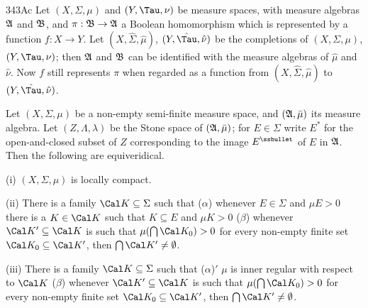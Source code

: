 \spheader 343Ac Let $(X,\Sigma,\mu)$ and $(Y,\Tau,\nu)$ be
measure spaces, with measure algebras $\frak A$ and $\frak B$, and
$\pi:\frak B\to\frak A$ a Boolean homomorphism which is represented by
a function $f:X\to Y$.   Let $(X,\hat\Sigma,\hat\mu)$,
$(Y,\hat\Tau,\hat\nu)$ be the completions of $(X,\Sigma,\mu)$,
$(Y,\Tau,\nu)$;  then $\frak A$ and $\frak B$ can be identified with
the measure algebras of $\hat\mu$ and $\hat\nu$.   Now
$f$ still represents $\pi$ when regarded as a function from
$(X,\hat\Sigma,\hat\mu)$ to $(Y,\hat\Tau,\hat\nu)$.   %

 Let $(X,\Sigma,\mu)$ be a non-empty
semi-finite measure space, and $(\frak A,\bar\mu)$ its measure algebra.
Let $(Z,\Lambda,\lambda)$ be the Stone space of $(\frak A,\bar\mu)$;
for $E\in\Sigma$ write $E^*$ for the
open-and-closed subset of $Z$ corresponding to the image $E^{\ssbullet}$
of $E$ in $\frak A$.   Then the following are equiveridical.

(i) $(X,\Sigma,\mu)$ is locally compact.

(ii) There is a family $\Cal K\subseteq\Sigma$ such that ($\alpha$)
whenever $E\in\Sigma$ and $\mu E>0$ there is a $K\in\Cal K$ such that
$K\subseteq E$
and $\mu K>0$ ($\beta$) whenever $\Cal K'\subseteq\Cal K$ is such that
$\mu(\bigcap\Cal K_0)>0$ for every non-empty finite set
$\Cal K_0\subseteq\Cal K'$, then $\bigcap\Cal K'\ne\emptyset$.

(iii) There is a family $\Cal K\subseteq\Sigma$ such that ($\alpha$)$'$
$\mu$ is inner regular with respect to $\Cal K$ ($\beta$) whenever
$\Cal K'\subseteq\Cal K$ is such that $\mu(\bigcap\Cal K_0)>0$ for every
non-empty finite set $\Cal K_0\subseteq\Cal K'$, then
$\bigcap\Cal K'\ne\emptyset$.

